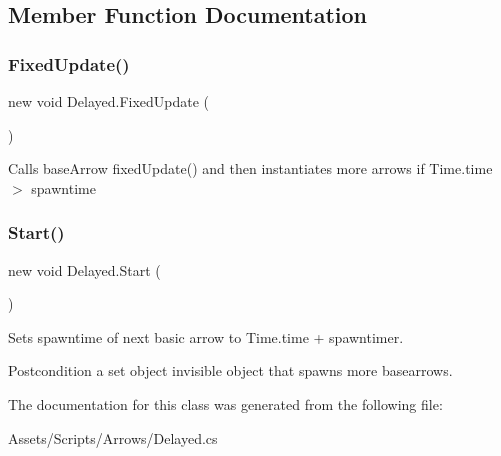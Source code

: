 \subsection{Member Function Documentation}
\mbox{\label{class_delayed_a2c17802ed1b249f91240a20a07ef1019}} 
\subsubsection{\texorpdfstring{Fixed\+Update()}{FixedUpdate()}}
{\footnotesize\ttfamily new void Delayed.\+Fixed\+Update (\begin{DoxyParamCaption}{ }\end{DoxyParamCaption})\hspace{0.3cm}{\ttfamily [private]}}

Calls base\+Arrow fixed\+Update() and then instantiates more arrows if Time.\+time $>$ spawntime \mbox{\label{class_delayed_a680d8010c92af858e6d0ee4fe4711961}} 
\subsubsection{\texorpdfstring{Start()}{Start()}}
{\footnotesize\ttfamily new void Delayed.\+Start (\begin{DoxyParamCaption}{ }\end{DoxyParamCaption})\hspace{0.3cm}{\ttfamily [private]}}

Sets spawntime of next basic arrow to Time.\+time + spawntimer. \begin{DoxyPostcond}{Postcondition}
a set object invisible object that spawns more basearrows. 
\end{DoxyPostcond}


The documentation for this class was generated from the following file\+:\begin{DoxyCompactItemize}
\item 
Assets/\+Scripts/\+Arrows/Delayed.\+cs\end{DoxyCompactItemize}

